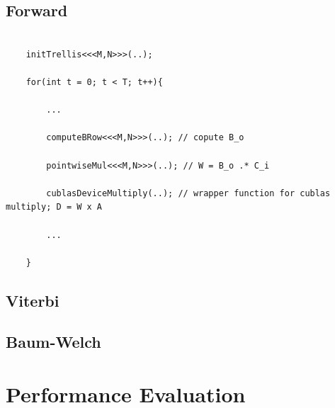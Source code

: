 \documentclass[english, paper=a4]{scrartcl}
\begin{document}
\subsection{Forward}
\begin{verbatim}

	initTrellis<<<M,N>>>(..);

	for(int t = 0; t < T; t++){
	
		...
		
		computeBRow<<<M,N>>>(..); // copute B_o
		
		pointwiseMul<<<M,N>>>(..); // W = B_o .* C_i
		
		cublasDeviceMultiply(..); // wrapper function for cublas multiply; D = W x A
		
		...
	
	}

\end{verbatim}

\subsection{Viterbi}

\subsection{Baum-Welch}

\section{Performance Evaluation}








\end{document}
